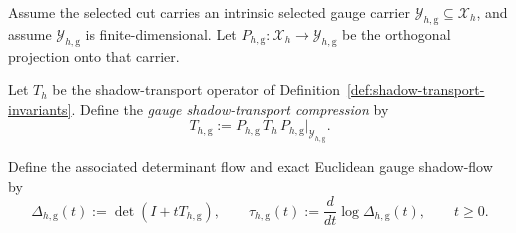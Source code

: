 \begin{definition}
\label{def:selected-gauge-shadow-flow}
Assume the selected cut carries an intrinsic selected gauge carrier
$\mathcal Y_{h,\mathrm g}\subseteq \mathcal X_h$, and assume
$\mathcal Y_{h,\mathrm g}$ is finite-dimensional.
Let $P_{h,\mathrm g}:\mathcal X_h\to \mathcal Y_{h,\mathrm g}$ be the
orthogonal projection onto that carrier.

Let $T_h$ be the shadow-transport operator of
Definition~\ref{def:shadow-transport-invariants}. Define the
\emph{gauge shadow-transport compression} by
\[
T_{h,\mathrm g}
:=
P_{h,\mathrm g}\,T_h\,P_{h,\mathrm g}\big|_{\mathcal Y_{h,\mathrm g}}.
\]

Define the associated determinant flow and exact Euclidean gauge
shadow-flow by
\[
\Delta_{h,\mathrm g}(t):=\det(I+tT_{h,\mathrm g}),
\qquad
\tau_{h,\mathrm g}(t):=\frac{d}{dt}\log \Delta_{h,\mathrm g}(t),
\qquad t\ge 0.
\]
\end{definition}


